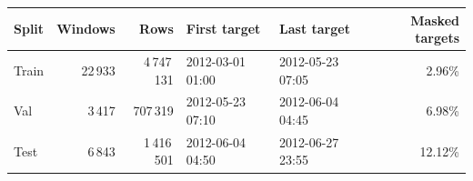 \begin{tabular}{@{}lrrllr@{}}
\toprule
Split & Windows & Rows & First target & Last target & Masked targets \\
\midrule
Train & 22\,933 & 4\,747\,131 & 2012-03-01 01:00 & 2012-05-23 07:05 & 2.96\% \\
Val & 3\,417 & 707\,319 & 2012-05-23 07:10 & 2012-06-04 04:45 & 6.98\% \\
Test & 6\,843 & 1\,416\,501 & 2012-06-04 04:50 & 2012-06-27 23:55 & 12.12\% \\
\bottomrule
\end{tabular}
